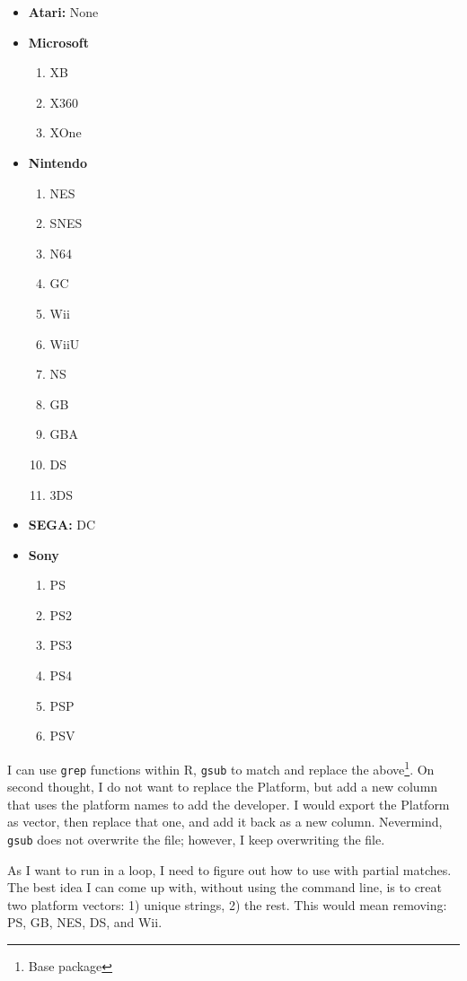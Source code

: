 \begin{itemize}
\item \textbf{Atari:} None
\item \textbf{Microsoft}
  \begin{enumerate}
  \item XB
  \item X360
  \item XOne
  \end{enumerate}
\item \textbf{Nintendo}
  \begin{enumerate}
  \item NES
  \item SNES
  \item N64
  \item GC
  \item Wii
  \item WiiU
  \item NS
  \item GB
  \item GBA
  \item DS
  \item 3DS
  \end{enumerate}
\item \textbf{SEGA:} DC
\item \textbf{Sony}
  \begin{enumerate}
  \item PS
  \item PS2
  \item PS3
  \item PS4
  \item PSP
  \item PSV
  \end{enumerate}
\end{itemize}
I can use \texttt{grep} functions within R, \texttt{gsub} to match and replace the above\footnote{Base package}. On second thought, I do not want to replace the Platform, but add a new column that uses the platform names to add the developer. I would export the Platform as vector, then replace that one, and add it back as a new column. Nevermind, \texttt{gsub} does not overwrite the file; however, I keep overwriting the file.

As I want to run in a loop, I need to figure out how to use with partial matches. The best idea I can come up with, without using the command line, is to creat two platform vectors: 1) unique strings, 2) the rest. This would mean removing: PS, GB, NES, DS, and Wii.

